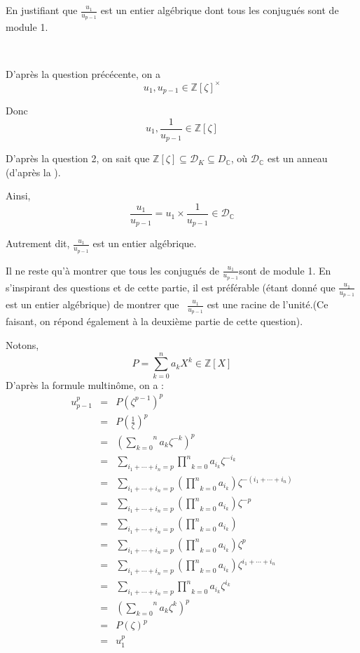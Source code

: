 En justifiant que $\frac{u_1}{u_{p - 1}}$ est un entier alg{\'e}brique dont
tous les conjugu{\'e}s sont de module 1.

\

D'apr{\`e}s la question pr{\'e}c{\'e}cente, on a
\[ u_1, u_{p - 1} \in \mathbb{Z} [\zeta]^{\times} \]


Donc
\[ u_1, \frac{1}{u_{p - 1}} \in \mathbb{Z} [\zeta]  \]


D'apr{\`e}s la question 2, on sait que $\mathbb{Z} [\zeta] \subseteq
\mathcal{D}_K \subseteq D_{\mathbb{C}}$, o{\`u} $\mathcal{D}_{\mathbb{C}}$ est
un anneau (d'apr{\`e}s la ).

Ainsi,
\[ \frac{u_1}{u_{p - 1}} = u_1 \times \frac{1}{u_{p - 1}} \in
   \mathcal{D}_{\mathbb{C}}  \]


Autrement dit, $\frac{u_1}{u_{p - 1}}$ est un entier alg{\'e}brique.

Il ne reste qu'{\`a} montrer que tous les conjugu{\'e}s de $\frac{u_1}{u_{p -
1}} $sont de module 1. En s'inspirant des questions  et
 de cette partie, il est pr{\'e}f{\'e}rable ({\'e}tant
donn{\'e} que $\frac{u_1}{u_{p - 1}}$ est un entier alg{\'e}brique) de montrer
que \ $\frac{u_1}{u_{p - 1}}$ est une racine de l'unit{\'e}.(Ce faisant, on
r{\'e}pond {\'e}galement {\`a} la deuxi{\`e}me partie de cette question).

Notons,
\[ P = \overset{n}{\underset{k = 0}{\sum}} a_k X^k \in \mathbb{Z} [X] \]
D'apr{\`e}s la formule multin{\^o}me, on a :
\begin{eqnarray*}
  u_{p - 1}^p & = & P (\zeta^{p - 1})^p\\
  & = & P \left( \frac{1}{\zeta} \right)^p\\
  & = & \left( \overset{n}{\underset{k = 0}{\sum}} a_k \zeta^{- k}
  \right)^p\\
  & = & \underset{i_1 + \cdots + i_n = p}{\sum} \underset{k =
  0}{\overset{n}{\prod}} a_{i_k} \zeta^{- i_k}\\
  & = & \underset{i_1 + \cdots + i_n = p}{\sum} \left( \underset{k =
  0}{\overset{n}{\prod}} a_{i_k} \right) \zeta^{- (i_1 + \cdots + i_n)}\\
  & = & \underset{i_1 + \cdots + i_n = p}{\sum} \left( \underset{k =
  0}{\overset{n}{\prod}} a_{i_k} \right) \zeta^{- p}\\
  & = & \underset{i_1 + \cdots + i_n = p}{\sum} \left( \underset{k =
  0}{\overset{n}{\prod}} a_{i_k} \right)\\
  & = & \underset{i_1 + \cdots + i_n = p}{\sum} \left( \underset{k =
  0}{\overset{n}{\prod}} a_{i_k} \right) \zeta^p\\
  & = & \underset{i_1 + \cdots + i_n = p}{\sum} \left( \underset{k =
  0}{\overset{n}{\prod}} a_{i_k} \right) \zeta^{i_1 + \cdots + i_n}\\
  & = & \underset{i_1 + \cdots + i_n = p}{\sum} \underset{k =
  0}{\overset{n}{\prod}} a_{i_k} \zeta^{i_k}\\
  & = & \left( \overset{n}{\underset{k = 0}{\sum}} a_k \zeta^k \right)^p\\
  & = & P (\zeta)^p\\
  & = & u^p_1
\end{eqnarray*}


